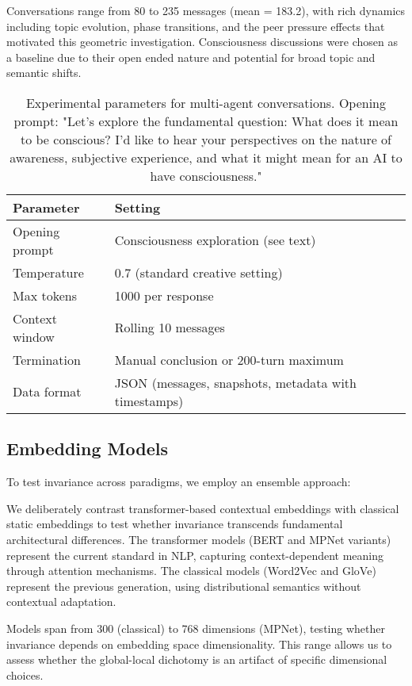 \documentclass[11pt,letterpaper]{article}
\newcommand{\minConvLength}{80}
\newcommand{\maxConvLength}{235}
\newcommand{\meanConvLength}{183.2}
\begin{document}
Conversations range from \minConvLength{} to \maxConvLength{} messages (mean = \meanConvLength{}), with rich dynamics including topic evolution, phase transitions, and the peer pressure effects that motivated this geometric investigation. Consciousness discussions were chosen as a baseline due to their open ended nature and potential for broad topic and semantic shifts. 

\begin{table}[h]
\centering
\begin{tabular}{ll}
\toprule
Parameter & Setting \\
\midrule
Opening prompt & Consciousness exploration (see text) \\
Temperature & 0.7 (standard creative setting) \\
Max tokens & 1000 per response \\
Context window & Rolling 10 messages \\
Termination & Manual conclusion or 200-turn maximum \\
Data format & JSON (messages, snapshots, metadata with timestamps) \\
\bottomrule
\end{tabular}
\caption{Experimental parameters for multi-agent conversations. Opening prompt: "Let's explore the fundamental question: What does it mean to be conscious? I'd like to hear your perspectives on the nature of awareness, subjective experience, and what it might mean for an AI to have consciousness."}
\label{tab:conversation_setup}
\end{table}

\subsection{Embedding Models}

To test invariance across paradigms, we employ an ensemble approach:

We deliberately contrast transformer-based contextual embeddings with classical static embeddings to test whether invariance transcends fundamental architectural differences. The transformer models (BERT and MPNet variants) represent the current standard in NLP, capturing context-dependent meaning through attention mechanisms. The classical models (Word2Vec and GloVe) represent the previous generation, using distributional semantics without contextual adaptation.

Models span from 300 (classical) to 768 dimensions (MPNet), testing whether invariance depends on embedding space dimensionality. This range allows us to assess whether the global-local dichotomy is an artifact of specific dimensional choices.
\end{document}
